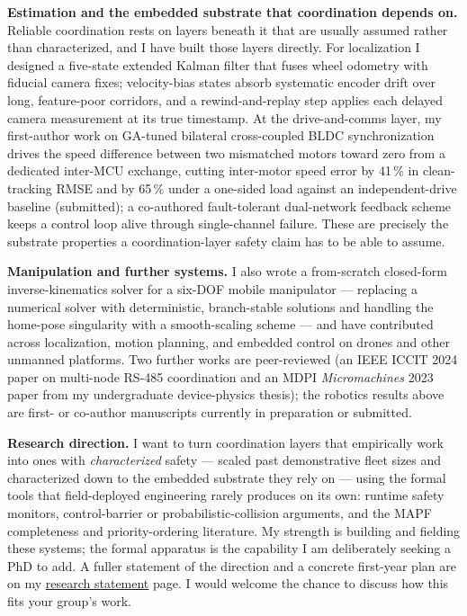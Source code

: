 \documentclass[a4paper,11pt]{article}
\begin{document}
\textbf{Estimation and the embedded substrate that coordination depends on.}
Reliable coordination rests on layers beneath it that are usually assumed rather
than characterized, and I have built those layers directly. For localization I
designed a five-state extended Kalman filter that fuses wheel odometry with
fiducial camera fixes; velocity-bias states absorb systematic encoder drift over
long, feature-poor corridors, and a rewind-and-replay step applies each delayed
camera measurement at its true timestamp. At the drive-and-comms layer, my
first-author work on GA-tuned bilateral cross-coupled BLDC synchronization drives
the speed difference between two mismatched motors toward zero from a dedicated
inter-MCU exchange, cutting inter-motor speed error by 41\,\% in clean-tracking
RMSE and by 65\,\% under a one-sided load against an independent-drive baseline (submitted); a co-authored fault-tolerant dual-network feedback scheme keeps a
control loop alive through single-channel failure. These are precisely the
substrate properties a coordination-layer safety claim has to be able to assume.

\textbf{Manipulation and further systems.} I also wrote a from-scratch
closed-form inverse-kinematics solver for a six-DOF mobile manipulator ---
replacing a numerical solver with deterministic, branch-stable solutions and
handling the home-pose singularity with a smooth-scaling scheme --- and have
contributed across localization, motion planning, and embedded control on
drones and other unmanned platforms. Two further works are peer-reviewed
(an IEEE ICCIT 2024 paper on multi-node RS-485 coordination and an MDPI
\textit{Micromachines} 2023 paper from my undergraduate device-physics thesis);
the robotics results above are first- or co-author manuscripts currently in
preparation or submitted.

\textbf{Research direction.} I want to turn coordination layers that empirically
work into ones with \emph{characterized} safety --- scaled past demonstrative
fleet sizes and characterized down to the embedded substrate they rely on ---
using the formal tools that field-deployed engineering rarely produces on its
own: runtime safety monitors, control-barrier or probabilistic-collision
arguments, and the MAPF completeness and priority-ordering literature. My
strength is building and fielding these systems; the formal apparatus is the
capability I am deliberately seeking a PhD to add. A fuller statement of the
direction and a concrete first-year plan are on my
\href{https://Monirul305.github.io/research-statement/}{research statement} page.
I would welcome the chance to discuss how this fits your group's work.
\end{document}
